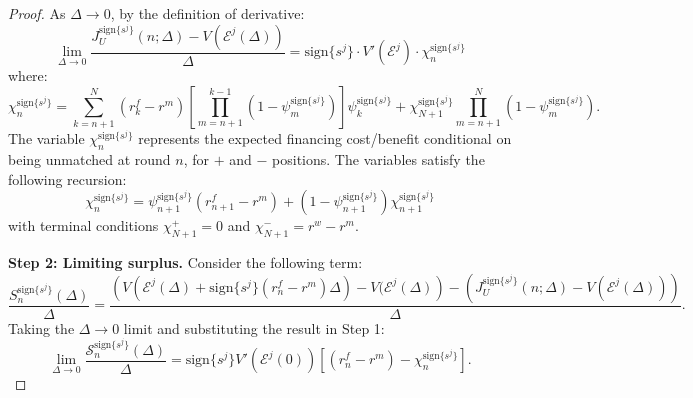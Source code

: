 \begin{proof}
As $\Delta \to 0$, by the definition of derivative:
\[
\lim_{\Delta \to 0} \frac{J_U^{\text{sign}\{s^j\}}(n;\Delta) - V(\mathcal{E}^j(\Delta))}{\Delta} = \text{sign}\{s^j\} \cdot V'(\mathcal{E}^j) \cdot \chi_n^{\text{sign}\{s^j\}}
\]
where:
\begin{equation}
\label{eq:appendix.recursion}
\chi_n^{\text{sign}\{s^j\}} = \sum_{k=n+1}^{N} (r_k^f - r^m)\left[\prod_{m=n+1}^{k-1}(1-\psi_m^{\text{sign}\{s^j\}})\right]\psi_k^{\text{sign}\{s^j\}} + \chi_{N+1}^{\text{sign}\{s^j\}}\prod_{m=n+1}^{N}(1-\psi_m^{\text{sign}\{s^j\}}).
\end{equation}
The variable $\chi_n^{\text{sign}\{s^j\}}$ represents the expected financing cost/benefit conditional on being unmatched at round $n$, for $+$ and $-$ positions. The variables satisfy the following recursion:
\begin{equation}
\chi_n^{\text{sign}\{s^j\}} = \psi_{n+1}^{\text{sign}\{s^j\}}(r_{n+1}^f - r^m) + (1-\psi_{n+1}^{\text{sign}\{s^j\}})\chi_{n+1}^{\text{sign}\{s^j\}}
\label{eq:chi-recursion}
\end{equation}
with terminal conditions $\chi_{N+1}^{+} = 0$ and $\chi_{N+1}^{-} = r^w - r^m$.

\textbf{Step 2: Limiting surplus.} Consider the following term:
\begin{equation*}
\frac{S_n^{\text{sign}\{s^j\}}(\Delta)}{\Delta} = \frac{\left(V(\mathcal{E}^j(\Delta) + \text{sign}\{s^j\}(r_n^f - r^m)\Delta) - V(\mathcal{E}^j(\Delta)\right) - \left(J_U^{\text{sign}\{s^j\}}(n;\Delta) - V(\mathcal{E}^j(\Delta))\right)}{\Delta}.
\end{equation*}
Taking the $\Delta \to 0$ limit and substituting the result in Step 1:
\[\lim_{\Delta \to 0} \frac{\mathcal{S}_n^{\text{sign}\{s^j\}}(\Delta)}{\Delta} = \text{sign}\{s^j\}V'(\mathcal{E}^j(0))[(r_n^f - r^m) - \chi_n^{\text{sign}\{s^j\}}].\]


\end{proof}
